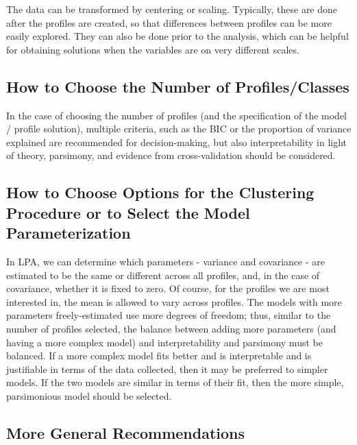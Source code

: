 \documentclass[
  english,
  man]{apa6}
\begin{document}
The data can be transformed by centering or scaling. Typically, these are done
after the profiles are created, so that differences between profiles can be more
easily explored. They can also be done prior to the analysis, which can be
helpful for obtaining solutions when the variables are on very different
scales.

\hypertarget{how-to-choose-the-number-of-profilesclasses}{%
\subsection{How to Choose the Number of Profiles/Classes}\label{how-to-choose-the-number-of-profilesclasses}}

In the case of choosing the number of profiles (and the specification of the
model / profile solution), multiple criteria, such as the BIC or the proportion
of variance explained are recommended for decision-making, but also
interpretability in light of theory, parsimony, and evidence from
cross-validation should be considered.

\hypertarget{how-to-choose-options-for-the-clustering-procedure-or-to-select-the-model-parameterization}{%
\subsection{How to Choose Options for the Clustering Procedure or to Select the Model Parameterization}\label{how-to-choose-options-for-the-clustering-procedure-or-to-select-the-model-parameterization}}

In LPA, we can determine which parameters - variance
and covariance - are estimated to be the same or different across all profiles,
and, in the case of covariance, whether it is fixed to zero. Of course, for the
profiles we are most interested in, the mean is allowed to vary across profiles.
The models with more parameters freely-estimated use more degrees of freedom;
thus, similar to the number of profiles selected, the balance between adding
more parameters (and having a more complex model) and interpretability and
parsimony must be balanced. If a more complex model fits better and is
interpretable and is justifiable in terms of the data collected, then it may be
preferred to simpler models. If the two models are similar in terms of their
fit, then the more simple, parsimonious model should be selected.

\hypertarget{more-general-recommendations}{%
\subsection{More General Recommendations}\label{more-general-recommendations}}
\end{document}
